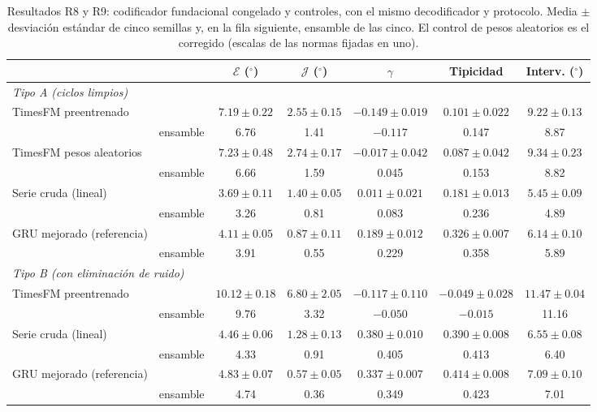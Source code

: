 \documentclass[11pt,a4paper]{article}
\newcommand{\gr}{$^{\circ}$}
\begin{document}
\begin{table}[h]
\centering\footnotesize
\setlength{\tabcolsep}{2.5pt}
\begin{tabular}{llccccc}
\toprule
 & & $\mathcal E$ (\gr) & $\mathcal J$ (\gr) & $\gamma$ & Tipicidad & Interv. (\gr) \\
\midrule
\multicolumn{7}{l}{\textit{Tipo A (ciclos limpios)}}\\
TimesFM preentrenado & & $7.19\pm0.22$ & $2.55\pm0.15$ & $-0.149\pm0.019$ & $0.101\pm0.022$ & $9.22\pm0.13$ \\
 & ensamble & 6.76 & 1.41 & $-0.117$ & 0.147 & 8.87 \\
TimesFM pesos aleatorios & & $7.23\pm0.48$ & $2.74\pm0.17$ & $-0.017\pm0.042$ & $0.087\pm0.042$ & $9.34\pm0.23$ \\
 & ensamble & 6.66 & 1.59 & 0.045 & 0.153 & 8.82 \\
Serie cruda (lineal) & & $3.69\pm0.11$ & $1.40\pm0.05$ & $0.011\pm0.021$ & $0.181\pm0.013$ & $5.45\pm0.09$ \\
 & ensamble & 3.26 & 0.81 & 0.083 & 0.236 & 4.89 \\
GRU mejorado (referencia) & & $4.11\pm0.05$ & $0.87\pm0.11$ & $0.189\pm0.012$ & $0.326\pm0.007$ & $6.14\pm0.10$ \\
 & ensamble & 3.91 & 0.55 & 0.229 & 0.358 & 5.89 \\
\midrule
\multicolumn{7}{l}{\textit{Tipo B (con eliminación de ruido)}}\\
TimesFM preentrenado & & $10.12\pm0.18$ & $6.80\pm2.05$ & $-0.117\pm0.110$ & $-0.049\pm0.028$ & $11.47\pm0.04$ \\
 & ensamble & 9.76 & 3.32 & $-0.050$ & $-0.015$ & 11.16 \\
Serie cruda (lineal) & & $4.46\pm0.06$ & $1.28\pm0.13$ & $0.380\pm0.010$ & $0.390\pm0.008$ & $6.55\pm0.08$ \\
 & ensamble & 4.33 & 0.91 & 0.405 & 0.413 & 6.40 \\
GRU mejorado (referencia) & & $4.83\pm0.07$ & $0.57\pm0.05$ & $0.337\pm0.007$ & $0.414\pm0.008$ & $7.09\pm0.10$ \\
 & ensamble & 4.74 & 0.36 & 0.349 & 0.423 & 7.01 \\
\bottomrule
\end{tabular}
\caption{Resultados R8 y R9: codificador fundacional congelado y controles, con el mismo decodificador y protocolo. Media $\pm$ desviación estándar de cinco semillas y, en la fila siguiente, ensamble de las cinco. El control de pesos aleatorios es el corregido (escalas de las normas fijadas en uno).}
\label{tab:fm}
\end{table}
\end{document}
